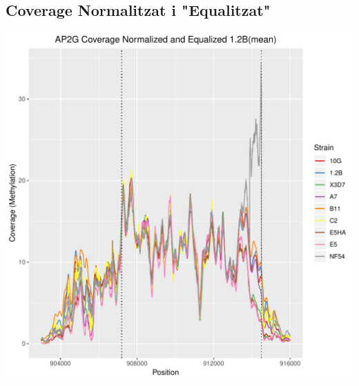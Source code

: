 \documentclass{article}\usepackage[]{graphicx}\usepackage[]{color}
\newenvironment{knitrout}{}{} %
\begin{document}
\subsection{Coverage Normalitzat i "Equalitzat"}
\begin{knitrout}
\color{fgcolor}
\includegraphics[width=1\linewidth]{figure/plot_NormequalizedCov-1} 

\end{knitrout}
\clearpage
\end{document}

